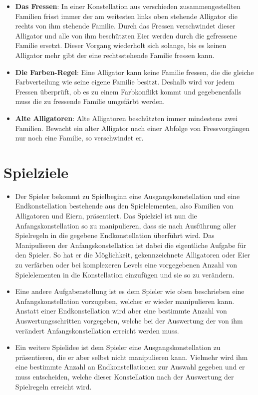 	\begin{itemize}
	
	\item \textbf{Das Fressen}: In einer Konstellation aus verschieden zusammengestellten Familien frisst immer der am weitesten links oben stehende Alligator die rechts von ihm stehende Familie. Durch das Fressen verschwindet dieser Alligator und alle von ihm beschützten Eier werden durch die gefressene Familie ersetzt. Dieser Vorgang wiederholt sich solange, bis es keinen Alligator mehr gibt der eine rechtsstehende Familie fressen kann.
	
	\item \textbf{Die Farben-Regel}: Eine Alligator kann keine Familie fressen, die die gleiche Farbverteilung wie seine eigene Familie besitzt.  Deshalb wird vor jedem Fressen überprüft, ob es zu einem Farbkonflikt kommt und gegebenenfalls muss die zu fressende Familie umgefärbt werden.
	
	\item \textbf{Alte Alligatoren}: Alte Alligatoren beschützten immer mindestens zwei Familien. Bewacht ein alter Alligator nach einer Abfolge von Fressvorgängen nur noch eine Familie, so verschwindet er.
	
	\end{itemize}	
	
\section{Spielziele}
	
	\begin{itemize}
	
		\item Der Spieler bekommt zu Spielbeginn eine Ausgangskonstellation und eine Endkonstellation bestehende aus den Spielelementen, also Familien von Alligatoren und Eiern, präsentiert. Das Spielziel ist nun die Anfangskonstellation so zu manipulieren, dass sie nach Ausführung aller Spielregeln in die gegebene Endkonstellation überführt wird. Das Manipulieren der Anfangskonstellation ist dabei die eigentliche Aufgabe für den Spieler. So hat er die Möglichkeit, gekennzeichnete Alligatoren oder Eier zu verfärben oder bei komplexeren Levels eine vorgegebenen Anzahl von Spielelementen in die Konstellation einzufügen und sie so zu verändern.
		
		\item Eine andere Aufgabenstellung ist es dem Spieler wie oben beschrieben eine Anfangskonstellation vorzugeben, welcher er wieder manipulieren kann. Anstatt einer Endkonstellation wird aber eine bestimmte Anzahl von Auswertungsschritten vorgegeben, welche bei der Auswertung der von ihm verändert Anfangskonstellation erreicht werden muss.
		
		\item Ein weitere Spielidee ist dem Spieler eine Ausgangskonstellation zu präsentieren, die er aber selbst nicht manipulieren kann. Vielmehr wird ihm eine bestimmte Anzahl an Endkonstellationen zur Auswahl gegeben und er muss entscheiden, welche dieser Konstellation nach der Auswertung der Spielregeln erreicht wird.
		
	\end{itemize}

	
